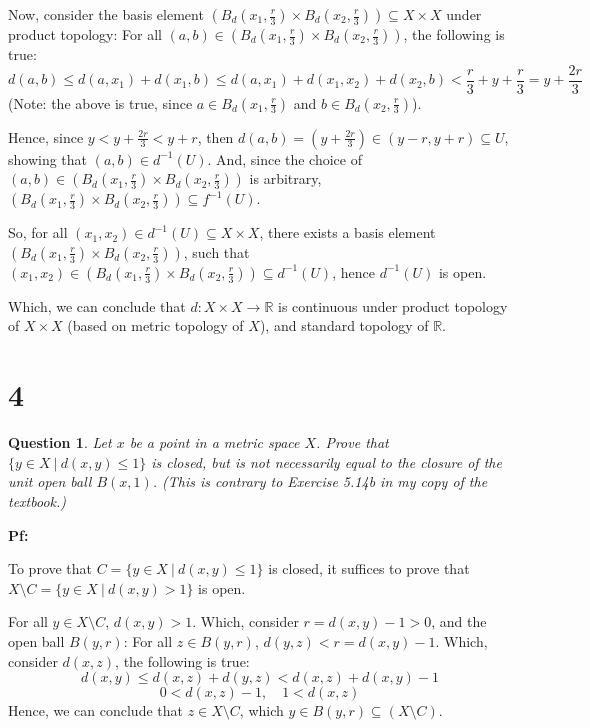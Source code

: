 \documentclass{article}
\newtheorem{question}{Question}
\begin{document}
\hfill

Now, consider the basis element $\left(B_d(x_1,\frac{r}{3})\times B_d(x_2,\frac{r}{3})\right)\subseteq X\times X$ under product topology:
For all $(a,b)\in \left(B_d(x_1,\frac{r}{3})\times B_d(x_2,\frac{r}{3})\right)$, the following is true:
$$d(a,b) \leq d(a,x_1) + d(x_1,b) \leq d(a,x_1)+d(x_1,x_2)+d(x_2,b) < \frac{r}{3}+y+\frac{r}{3} = y+\frac{2r}{3}$$
(Note: the above is true, since $a\in B_d(x_1,\frac{r}{3})$ and $b\in B_d(x_2,\frac{r}{3})$).

Hence, since $y<y+\frac{2r}{3} < y+r$, then $d(a,b)=(y+\frac{2r}{3}) \in (y-r,y+r)\subseteq U$, showing that $(a,b)\in d^{-1}(U)$.
And, since the choice of $(a,b)\in \left(B_d(x_1,\frac{r}{3})\times B_d(x_2,\frac{r}{3})\right)$ is arbitrary, $\left(B_d(x_1,\frac{r}{3})\times B_d(x_2,\frac{r}{3})\right) \subseteq f^{-1}(U)$.

\hfill

So, for all $(x_1,x_2) \in d^{-1}(U) \subseteq X\times X$, there exists a basis element $\left(B_d(x_1,\frac{r}{3})\times B_d(x_2,\frac{r}{3})\right)$, 
such that $(x_1,x_2)\in \left(B_d(x_1,\frac{r}{3})\times B_d(x_2,\frac{r}{3})\right)\subseteq d^{-1}(U)$,
hence $d^{-1}(U)$ is open.

Which, we can conclude that $d:X\times X\rightarrow \mathbb{R}$ is continuous under product topology of $X\times X$ (based on metric topology of $X$), and standard topology of $\mathbb{R}$.

\break

\section*{4}
\begin{myBox}[]{}
    \begin{question}
        Let $x$ be a point in a metric space $X$. Prove that $\{y\in X\ |\ d(x,y)\leq 1\}$ is
        closed, but is not necessarily equal to the closure of the unit open ball $B(x, 1)$.
        (This is contrary to Exercise 5.14b in my copy of the textbook.)
    \end{question}
\end{myBox}

\textbf{Pf:}

To prove that $C=\{y\in X\ |\ d(x,y)\leq 1\}$ is closed, it suffices to prove that $X\setminus C = \{y\in X\ |\ d(x,y)>1\}$ is open.

For all $y\in X\setminus C$, $d(x,y)>1$. Which, consider $r=d(x,y)-1>0$, and the open ball $B(y,r)$:
For all $z\in B(y,r)$, $d(y,z) < r = d(x,y)-1$. Which, consider $d(x,z)$, the following is true:
$$d(x,y) \leq d(x,z)+d(y,z) < d(x,z)+d(x,y)-1$$
$$0 < d(x,z)-1,\quad 1<d(x,z)$$
Hence, we can conclude that $z\in X\setminus C$, which $y\in B(y,r)\subseteq (X\setminus C)$.
\end{document}
